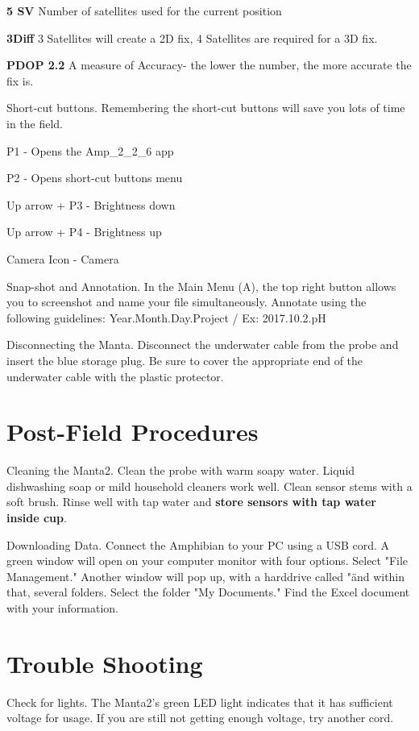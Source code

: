 \documentclass[12pt]{../SOP3}\usepackage[]{graphicx}\usepackage[]{color}
\begin{document}
\textbf{5 SV} Number of satellites used for the current position

\textbf{3Diff} 3 Satellites will create a 2D fix, 4 Satellites are required for a 3D fix.

\textbf{PDOP 2.2} A measure of Accuracy- the lower the number, the more accurate the fix is.

\NP Short-cut buttons. Remembering the short-cut buttons will save you lots of time in the field. 

{P1} - Opens the Amp\_2\_2\_6 app

{P2} - Opens short-cut buttons menu

{Up arrow + P3} - Brightness down

{Up arrow + P4} - Brightness up

{Camera Icon} - Camera

\NP Snap-shot and Annotation. In the Main Menu (A), the top right button allows you to screenshot and name your file simultaneously. Annotate using the following guidelines: Year.Month.Day.Project / Ex: 2017.10.2.pH

\NP Disconnecting the Manta. Disconnect the underwater cable from the probe and insert the blue storage plug. Be sure to cover the appropriate end of the underwater cable with the plastic protector. 

\section{Post-Field Procedures}

\NP Cleaning the Manta2. Clean the probe with warm soapy water. Liquid dishwashing soap or mild household cleaners work well. Clean sensor stems with a soft brush. Rinse well with tap water and \textbf{store sensors with tap water inside cup}.

\NP Downloading Data. Connect the Amphibian to your PC using a USB cord. A green window will open on your computer monitor with four options. Select "File Management." Another window will pop up, with a harddrive called "\" and within that, several folders. Select the folder "My Documents." Find the Excel document with your information.

\section{Trouble Shooting}

\NP Check for lights. The Manta2's green LED light indicates that it has sufficient voltage for usage. If you are still not getting enough voltage, try another cord.
\end{document}
